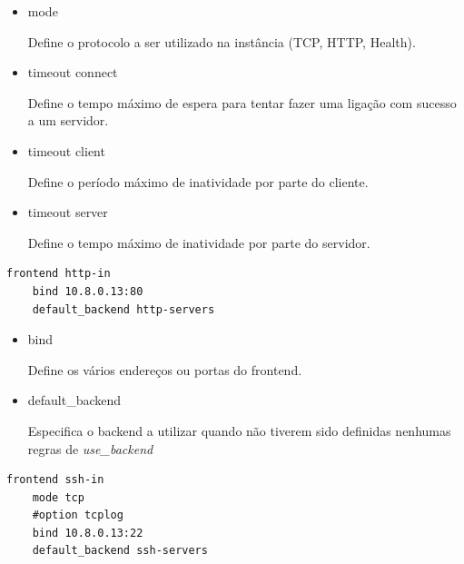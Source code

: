 \documentclass[12pt,a4paper]{article}
\begin{document}
\begin{itemize}
    \item mode
    
Define o protocolo a ser utilizado na instância (TCP, HTTP, Health).
    
    \item timeout connect
    
Define o tempo máximo de espera para tentar fazer uma ligação com sucesso a um servidor.
    
    \item timeout client
    
Define o período máximo de inatividade por parte do cliente.
    
    \item timeout server
    
Define o tempo máximo de inatividade por parte do servidor.
    
\end{itemize}


\begin{verbatim}
frontend http-in  
    bind 10.8.0.13:80
    default_backend http-servers

\end{verbatim}

\begin{itemize}
    \item bind
    
Define os vários endereços ou portas do frontend.
    
    \item default\_backend 
    
Especifica o backend a utilizar quando não tiverem sido definidas nenhumas regras de \emph{use\_backend}
\end{itemize}

\begin{verbatim}
frontend ssh-in  
    mode tcp
    #option tcplog
    bind 10.8.0.13:22
    default_backend ssh-servers
\end{verbatim}
\end{document}
